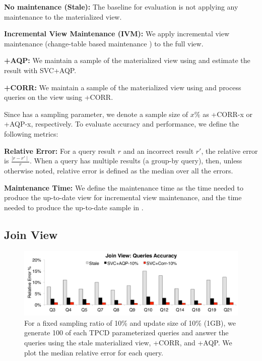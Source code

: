 \noindent\textbf{No maintenance (Stale): } The baseline for evaluation is not applying any maintenance to the materialized view.

\noindent\textbf{Incremental View Maintenance (IVM): } We apply incremental view maintenance (change-table based maintenance \cite{gupta2006incremental}) to the full view.

\noindent\textbf{\svcnospace+AQP: } We maintain a sample of the materialized view using \svc and estimate the result with SVC+AQP.

\noindent\textbf{\svcnospace+CORR: } We maintain a sample of the materialized view using \svc and process queries on the view using \svcnospace+CORR.


Since \svc has a sampling parameter, we denote a sample size of $x \% $ as \svcnospace+CORR-x or \svcnospace+AQP-x, respectively. 
To evaluate accuracy and performance, we define the following metrics:

\noindent\textbf{Relative Error: } For a query result $r$ and an incorrect result $r'$, the relative error is $\frac{\mid r-r' \mid}{r}.$
When a query has multiple results (a group-by query), then, unless otherwise noted, relative error is defined as the median over all the errors.

\noindent\textbf{Maintenance Time: } We define the maintenance time as the time needed to produce the up-to-date view for incremental view maintenance, and the time needed to produce the up-to-date sample in \svc. 

\subsection{Join View}

\begin{figure}[t]
\centering
\includegraphics[scale=0.14]{exp/msj_3.pdf}\vspace{-.5em}
 \caption{For a fixed sampling ratio of 10\% and update size of 10\% (1GB), we generate 100 of each TPCD parameterized queries and answer the queries using the stale materialized view, \svcnospace+CORR, and \svcnospace+AQP. We plot the median relative error for each query.\label{exp-1-acc}}\vspace{-1em}
\end{figure}


